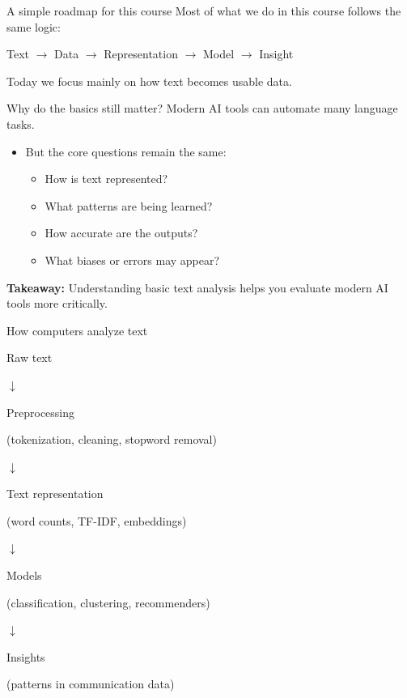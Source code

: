 \documentclass[handout]{beamer}
\begin{document}
\begin{frame}{A simple roadmap for this course}
\small
Most of what we do in this course follows the same logic:

\begin{center}
\large
Text $\rightarrow$ Data $\rightarrow$ Representation $\rightarrow$ Model $\rightarrow$ Insight
\end{center}

\vspace{0.3cm}
Today we focus mainly on how text becomes usable data.
\end{frame}

\begin{frame}{Why do the basics still matter?}
Modern AI tools can automate many language tasks.

\begin{itemize}
    \item But the core questions remain the same:
    \begin{itemize}
        \item How is text represented?
        \item What patterns are being learned?
        \item How accurate are the outputs?
        \item What biases or errors may appear?
    \end{itemize}
\end{itemize}

\vspace{0.3cm}
\textbf{Takeaway:} Understanding basic text analysis helps you evaluate modern AI tools more critically.
\end{frame}

\begin{frame}{How computers analyze text}
\begin{center}
\large
Raw text

\vspace{0.1cm}
$\downarrow$

\vspace{0.1cm}
Preprocessing

{\small(tokenization, cleaning, stopword removal)}

\vspace{0.1cm}
$\downarrow$

\vspace{0.1cm}
Text representation

{\small(word counts, TF-IDF, embeddings)}

\vspace{0.1cm}
$\downarrow$

\vspace{0.1cm}
Models

{\small(classification, clustering, recommenders)}

\vspace{0.1cm}
$\downarrow$

\vspace{0.1cm}
Insights

{\small(patterns in communication data)}
\end{center}
\end{frame}
\end{document}
